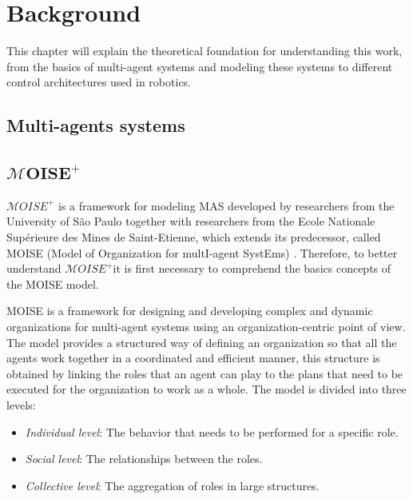 \def \MOISEp {$\mathcal{M}OISE^+$} 
\def \MOISEpBf {$\mathbf{\mathcal{M}OISE^+}$} 

\chapter{Background}
\label{ch:background}

This chapter will explain the theoretical foundation for understanding this work, from the basics of multi-agent systems and modeling these systems to different control architectures used in robotics.

\section{Multi-agents systems}



\section{\MOISEpBf}

\MOISEp \cite{MOISEp} is a framework for modeling MAS developed by researchers from the University of São Paulo together with researchers from the Ecole Nationale Supérieure des Mines de Saint-Etienne, which extends its predecessor, called MOISE (Model of Organization for multI-agent SystEms) \cite{Moise}. Therefore, to better understand \MOISEp it is first necessary to comprehend the basics concepts of the MOISE model.

MOISE is a framework for designing and developing complex and dynamic organizations for multi-agent systems using an organization-centric point of view. The model provides a structured way of defining an organization so that all the agents work together in a coordinated and efficient manner, this structure is obtained by linking the roles that an agent can play to the plans that need to be executed for the organization to work as a whole. The model is divided into three levels:

\begin{itemize}
    \item \textit{Individual level}: The behavior that needs to be performed for a specific role.
    \item \textit{Social level}: The relationships between the roles.
    \item \textit{Collective level}: The aggregation of roles in large structures.
\end{itemize}

